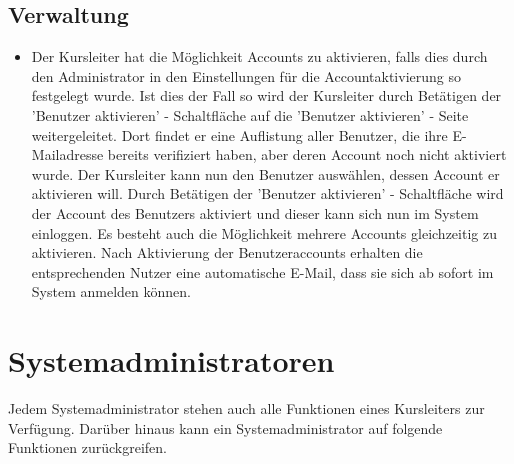 \documentclass[a4paper]{scrreprt}
\newcounter{Lc}
\newcounter{Hc}
\newcommand{\stepHc}{\stepcounter{Hc}\setcounter{Lc}{0}}
\begin{document}
		\subsection{Verwaltung}
			\begin{itemize}
				\item {}
					Der Kursleiter hat die Möglichkeit Accounts zu aktivieren, falls dies durch den Administrator in den Einstellungen für die Accountaktivierung so festgelegt wurde. Ist dies der Fall so wird der Kursleiter durch Betätigen der 'Benutzer aktivieren' - Schaltfläche auf die 'Benutzer aktivieren' - Seite weitergeleitet. Dort findet er eine Auflistung aller Benutzer, die ihre E-Mailadresse bereits verifiziert haben, aber deren Account noch nicht aktiviert wurde. Der Kursleiter kann nun den Benutzer auswählen, dessen Account er aktivieren will. Durch Betätigen der 'Benutzer aktivieren' - Schaltfläche wird der Account des Benutzers aktiviert und dieser kann sich nun im System einloggen. 
					Es besteht auch die Möglichkeit mehrere Accounts gleichzeitig zu aktivieren. Nach Aktivierung der Benutzeraccounts erhalten die entsprechenden Nutzer eine automatische E-Mail, dass sie sich ab sofort im System anmelden können.
			\end{itemize}

	\section{Systemadministratoren}
	Jedem Systemadministrator stehen auch alle Funktionen eines Kursleiters zur Verfügung. Darüber hinaus kann ein Systemadministrator auf folgende Funktionen zurückgreifen.
	\stepHc
\end{document}
